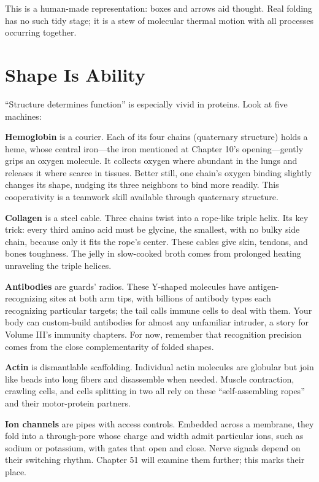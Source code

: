 This is a human-made representation: boxes and arrows aid thought. Real folding has no such tidy stage; it is a stew of molecular thermal motion with all processes occurring together.

\section{Shape Is Ability}

``Structure determines function'' is especially vivid in proteins. Look at five machines:

\textbf{Hemoglobin} is a courier. Each of its four chains (quaternary structure) holds a heme, whose central iron---the iron mentioned at Chapter 10's opening---gently grips an oxygen molecule. It collects oxygen where abundant in the lungs and releases it where scarce in tissues. Better still, one chain's oxygen binding slightly changes its shape, nudging its three neighbors to bind more readily. This cooperativity is a teamwork skill available through quaternary structure.

\textbf{Collagen} is a steel cable. Three chains twist into a rope-like triple helix. Its key trick: every third amino acid must be glycine, the smallest, with no bulky side chain, because only it fits the rope's center. These cables give skin, tendons, and bones toughness. The jelly in slow-cooked broth comes from prolonged heating unraveling the triple helices.

\textbf{Antibodies} are guards' radios. These Y-shaped molecules have antigen-recognizing sites at both arm tips, with billions of antibody types each recognizing particular targets; the tail calls immune cells to deal with them. Your body can custom-build antibodies for almost any unfamiliar intruder, a story for Volume III's immunity chapters. For now, remember that recognition precision comes from the close complementarity of folded shapes.

\textbf{Actin} is dismantlable scaffolding. Individual actin molecules are globular but join like beads into long fibers and disassemble when needed. Muscle contraction, crawling cells, and cells splitting in two all rely on these ``self-assembling ropes'' and their motor-protein partners.

\textbf{Ion channels} are pipes with access controls. Embedded across a membrane, they fold into a through-pore whose charge and width admit particular ions, such as sodium or potassium, with gates that open and close. Nerve signals depend on their switching rhythm. Chapter 51 will examine them further; this marks their place.

